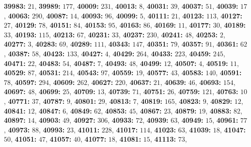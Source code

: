 \textsf{\bfseries 39983:} $21$, \textsf{\bfseries 39989:} $177$, \textsf{\bfseries 40009:} $231$, \textsf{\bfseries 40013:} $8$, \textsf{\bfseries 40031:} $39$, \textsf{\bfseries 40037:} $51$, \textsf{\bfseries 40039:} $17$, \textsf{\bfseries 40063:} $290$, \textsf{\bfseries 40087:} $14$, \textsf{\bfseries 40093:} $96$, \textsf{\bfseries 40099:} $5$, \textsf{\bfseries 40111:} $21$, \textsf{\bfseries 40123:} $113$, \textsf{\bfseries 40127:} $27$, \textsf{\bfseries 40129:} $78$, \textsf{\bfseries 40151:} $84$, \textsf{\bfseries 40153:} $95$, \textsf{\bfseries 40163:} $86$, \textsf{\bfseries 40169:} $11$, \textsf{\bfseries 40177:} $30$, \textsf{\bfseries 40189:} $33$, \textsf{\bfseries 40193:} $115$, \textsf{\bfseries 40213:} $67$, \textsf{\bfseries 40231:} $33$, \textsf{\bfseries 40237:} $230$, \textsf{\bfseries 40241:} $48$, \textsf{\bfseries 40253:} $2$, \textsf{\bfseries 40277:} $3$, \textsf{\bfseries 40283:} $69$, \textsf{\bfseries 40289:} $111$, \textsf{\bfseries 40343:} $147$, \textsf{\bfseries 40351:} $79$, \textsf{\bfseries 40357:} $91$, \textsf{\bfseries 40361:} $62$, \textsf{\bfseries 40387:} $58$, \textsf{\bfseries 40423:} $133$, \textsf{\bfseries 40427:} $4$, \textsf{\bfseries 40429:} $264$, \textsf{\bfseries 40433:} $223$, \textsf{\bfseries 40459:} $245$, \textsf{\bfseries 40471:} $22$, \textsf{\bfseries 40483:} $54$, \textsf{\bfseries 40487:} $7$, \textsf{\bfseries 40493:} $48$, \textsf{\bfseries 40499:} $12$, \textsf{\bfseries 40507:} $4$, \textsf{\bfseries 40519:} $11$, \textsf{\bfseries 40529:} $87$, \textsf{\bfseries 40531:} $214$, \textsf{\bfseries 40543:} $97$, \textsf{\bfseries 40559:} $19$, \textsf{\bfseries 40577:} $43$, \textsf{\bfseries 40583:} $140$, \textsf{\bfseries 40591:} $78$, \textsf{\bfseries 40597:} $294$, \textsf{\bfseries 40609:} $262$, \textsf{\bfseries 40627:} $220$, \textsf{\bfseries 40637:} $21$, \textsf{\bfseries 40639:} $46$, \textsf{\bfseries 40693:} $154$, \textsf{\bfseries 40697:} $48$, \textsf{\bfseries 40699:} $25$, \textsf{\bfseries 40709:} $13$, \textsf{\bfseries 40739:} $71$, \textsf{\bfseries 40751:} $26$, \textsf{\bfseries 40759:} $121$, \textsf{\bfseries 40763:} $10$, \textsf{\bfseries 40771:} $37$, \textsf{\bfseries 40787:} $9$, \textsf{\bfseries 40801:} $29$, \textsf{\bfseries 40813:} $7$, \textsf{\bfseries 40819:} $165$, \textsf{\bfseries 40823:} $9$, \textsf{\bfseries 40829:} $12$, \textsf{\bfseries 40841:} $12$, \textsf{\bfseries 40847:} $6$, \textsf{\bfseries 40849:} $62$, \textsf{\bfseries 40853:} $45$, \textsf{\bfseries 40867:} $23$, \textsf{\bfseries 40879:} $19$, \textsf{\bfseries 40883:} $82$, \textsf{\bfseries 40897:} $14$, \textsf{\bfseries 40903:} $49$, \textsf{\bfseries 40927:} $306$, \textsf{\bfseries 40933:} $72$, \textsf{\bfseries 40939:} $63$, \textsf{\bfseries 40949:} $15$, \textsf{\bfseries 40961:} $77$, \textsf{\bfseries 40973:} $88$, \textsf{\bfseries 40993:} $23$, \textsf{\bfseries 41011:} $228$, \textsf{\bfseries 41017:} $114$, \textsf{\bfseries 41023:} $63$, \textsf{\bfseries 41039:} $18$, \textsf{\bfseries 41047:} $50$, \textsf{\bfseries 41051:} $47$, \textsf{\bfseries 41057:} $40$, \textsf{\bfseries 41077:} $18$, \textsf{\bfseries 41081:} $15$, \textsf{\bfseries 41113:} $73$, 
